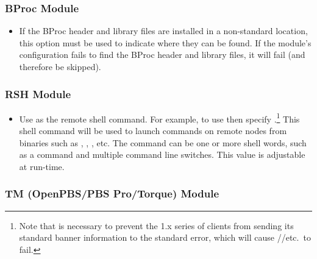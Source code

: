 

\subsubsection{BProc  Module}


\begin{itemize}

\item {}

  If the BProc header and library files are installed in a
  non-standard location, this option must be used to indicate where
  they can be found.  If the  module's configuration fails
  to find the BProc header and library files, it will fail (and
  therefore be skipped).

\end{itemize}



\subsubsection{RSH  Module}

\begin{itemize}

\item {}
  
  Use  as the remote shell command.  For example, to use
   then specify .\footnote{Note that  is necessary to prevent the
     1.x series of clients from sending its standard banner
    information to the standard error, which will cause
    //etc.\ to fail.}  This shell command
  will be used to launch commands on remote nodes from binaries such
  as , , , etc.  The command
  can be one or more shell words, such as a command and multiple
  command line switches.
  This value is adjustable at run-time.

\end{itemize}


\subsubsection{TM (OpenPBS/PBS Pro/Torque)  Module}

